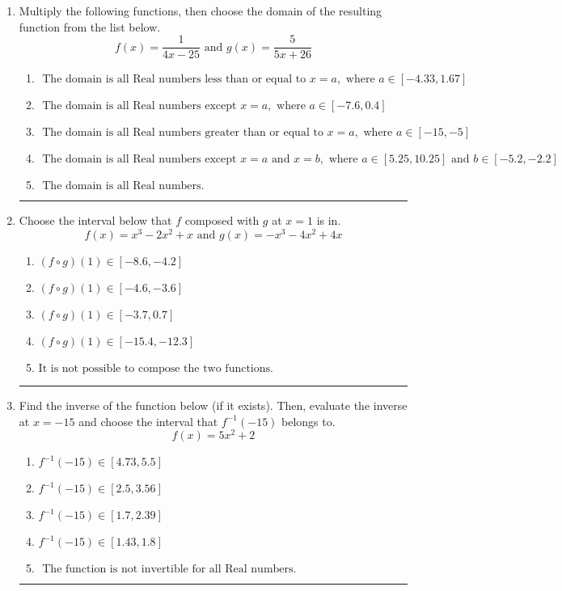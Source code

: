 \documentclass[14pt]{extbook}
\newcommand{\litem}[1]{\item#1\hspace*{-1cm}\rule{\textwidth}{0.4pt}}
\begin{document}
\begin{enumerate}
{\begin{enumerate}[label=\Alph*.]
\end{enumerate} }
\litem{
Multiply the following functions, then choose the domain of the resulting function from the list below.\[ f(x) = \frac{1}{4x-25} \text{ and } g(x) = \frac{5}{5x+26} \]\begin{enumerate}[label=\Alph*.]
\item \( \text{ The domain is all Real numbers less than or equal to } x = a, \text{ where } a \in [-4.33, 1.67] \)
\item \( \text{ The domain is all Real numbers except } x = a, \text{ where } a \in [-7.6, 0.4] \)
\item \( \text{ The domain is all Real numbers greater than or equal to } x = a, \text{ where } a \in [-15, -5] \)
\item \( \text{ The domain is all Real numbers except } x = a \text{ and } x = b, \text{ where } a \in [5.25, 10.25] \text{ and } b \in [-5.2, -2.2] \)
\item \( \text{ The domain is all Real numbers. } \)

\end{enumerate} }
\litem{
Choose the interval below that $f$ composed with $g$ at $x=1$ is in.\[ f(x) = x^{3} -2 x^{2} +x \text{ and } g(x) = -x^{3} -4 x^{2} +4 x \]\begin{enumerate}[label=\Alph*.]
\item \( (f \circ g)(1) \in [-8.6, -4.2] \)
\item \( (f \circ g)(1) \in [-4.6, -3.6] \)
\item \( (f \circ g)(1) \in [-3.7, 0.7] \)
\item \( (f \circ g)(1) \in [-15.4, -12.3] \)
\item \( \text{It is not possible to compose the two functions.} \)

\end{enumerate} }
\litem{
Find the inverse of the function below (if it exists). Then, evaluate the inverse at $x = -15$ and choose the interval that $f^{-1}(-15)$ belongs to.\[ f(x) = 5 x^2 + 2 \]\begin{enumerate}[label=\Alph*.]
\item \( f^{-1}(-15) \in [4.73, 5.5] \)
\item \( f^{-1}(-15) \in [2.5, 3.56] \)
\item \( f^{-1}(-15) \in [1.7, 2.39] \)
\item \( f^{-1}(-15) \in [1.43, 1.8] \)
\item \( \text{ The function is not invertible for all Real numbers. } \)


\end{enumerate}}
\end{enumerate}
\end{document}
